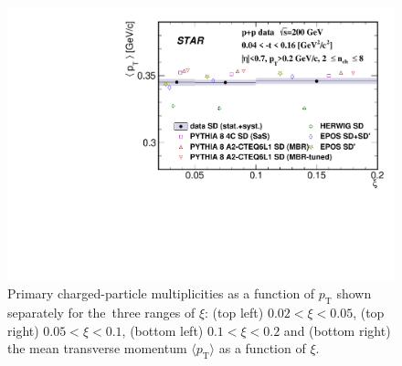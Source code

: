 \begin{figure}[h!]
	\hfill
	\includegraphics[width=.49\textwidth,page=1]{chapters/chrgSTAR/img/results/mean_pt_xi.pdf}
	\caption{Primary charged-particle multiplicities as a function of $p_\textrm{T}$ shown separately for the~three ranges of  $\xi$: (top left) $0.02<\xi<0.05$, (top right) $0.05<\xi<0.1$, (bottom left) $0.1<\xi<0.2$ and (bottom right) the mean transverse momentum $\langle p_\textrm{T}\rangle$ as a function of $\xi$.}
	\label{fig:results_star_pt}
\end{figure}

